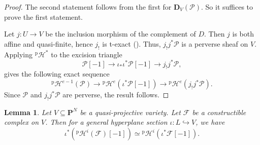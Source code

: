 \documentclass[english]{smfart}
\renewcommand{\mathbb}{\mathbf}
\renewcommand{\subset}{\subseteq}
\theoremstyle{remark}
\theoremstyle{plain}
\newtheorem{lemma}[remark]{Lemma}
\theoremstyle{definition}
\numberwithin{equation}{remark}
\theoremstyle{void}
\begin{document}
\begin{proof}
The second statement follows from the first for
\(\mathbb{D}_{V}(\mathcal{P})\).  So it suffices to prove the first
statement.

Let \(j\colon U \to V\) be the inclusion morphism of the complement of
\(D\).  Then \(j\) is both affine and quasi-finite, hence \(j_{!}\) is
t-exact
(\cite[Corollary~III~6.2]{kiehl-weissauer_weil-conjectures-perverse-sheaves}).
Thus, \(j_{!}j^{\ast}\mathcal{P}\) is a perverse sheaf on \(V\).
Applying \({}^{\mathrm{p}}\mathcal{H}^{\ast}\) to the excision
triangle
\[
\mathcal{P}[-1] \to \iota_{\ast}\iota^{\ast}\mathcal{P}[-1] \to j_{!}j^{\ast}\mathcal{P},
\]
gives the following exact sequence
\[
{}^{\mathrm{p}}\mathcal{H}^{e-1}(\mathcal{P}) \to {}^{\mathrm{p}} \mathcal{H}^e(\iota^{\ast}\mathcal{P}[-1])
\to {}^{\mathrm{p}}\mathcal{H}^e(j_{!}j^{\ast}\mathcal{P}).
\]
Since \(\mathcal{P}\) and \(j_{!}j^{\ast}\mathcal{P}\) are perverse,
the result follows.
\end{proof}

\begin{lemma}\label{lemma:general-hyperplane-preserve-perv}
Let \(V \subset \mathbb{P}^N\) be a quasi-projective variety.
Let \(\mathcal{F}\) be a constructible complex on \(V\).
Then for a general hyperplane section \(\iota\colon L \hookrightarrow V\),
we have
\[
\iota^{\ast}({}^{\mathrm{p}}\mathcal{H}^{i}(\mathcal{F})[-1]) \simeq {}^{\mathrm{p}}\mathcal{H}^{i}(\iota^{\ast}\mathcal{F}[-1]).
\]
\end{lemma}
\end{document}
